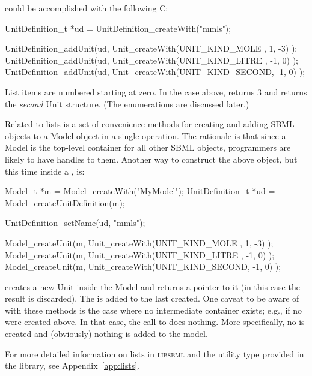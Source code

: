 \documentclass{sbmlmanual}
\newcommand{\libsbml}{\textsc{libsbml}}
\begin{document}
could be accomplished with the following C:

\begin{example}[c]
UnitDefinition_t *ud = UnitDefinition_createWith("mmls");

UnitDefinition_addUnit(ud, Unit_createWith(UNIT_KIND_MOLE  ,  1, -3) );
UnitDefinition_addUnit(ud, Unit_createWith(UNIT_KIND_LITRE , -1,  0) );
UnitDefinition_addUnit(ud, Unit_createWith(UNIT_KIND_SECOND, -1,  0) );
\end{example}


List items are numbered starting at zero.  In the case above,
 returns 3 and
 returns the
\emph{second} Unit structure.  (The  enumerations
are discussed later.)

Related to lists is a set of convenience methods for creating and adding
SBML objects to a Model object in a single operation.  The rationale is
that since a Model is the top-level container for all other SBML objects,
programmers are likely to have handles to them.  Another way to construct
the above  object, but this time inside a
, is:


\begin{example}[c]
Model_t            *m  = Model_createWith("MyModel");
UnitDefinition_t   *ud = Model_createUnitDefinition(m);

UnitDefinition_setName(ud, "mmls");

Model_createUnit(m, Unit_createWith(UNIT_KIND_MOLE  ,  1, -3) );
Model_createUnit(m, Unit_createWith(UNIT_KIND_LITRE , -1,  0) );
Model_createUnit(m, Unit_createWith(UNIT_KIND_SECOND, -1,  0) );
\end{example}


 creates a new Unit inside the Model
 and returns a pointer to it (in this case the result is
discarded).  The  is added to the last
 created.  One caveat to be aware of with these
methods is the case where no intermediate container exists; e.g., if no
 were created above.  In that case, the call to
 does nothing.  More specifically, no
 is created and (obviously) nothing is added to the model.

For more detailed information on lists in \libsbml{} and the
 utility type provided in the library, see
Appendix~\ref{app:lists}.
\end{document}
